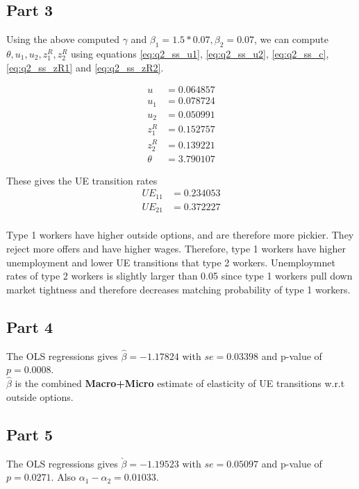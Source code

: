 \subsection*{Part 3}
Using the above computed $\gamma$ and $\beta_1 = 1.5*0.07, \beta_2 = 0.07$, we can compute $\theta, u_1, u_2, z^R_1, z^R_2$ using equations \ref{eq:q2_ss_u1}, \ref{eq:q2_ss_u2}, \ref{eq:q2_ss_c}, \ref{eq:q2_ss_zR1} and \ref{eq:q2_ss_zR2}. 

\begin{align}
    u &= 0.064857\\
    u_1 &= 0.078724\\
    u_2 &= 0.050991 \\
    z^R_1   &= 0.152757\\
    z^R_2   &= 0.139221\\
    \theta &= 3.790107
\end{align}

These gives the UE transition rates
\begin{align}
    UE_{11} &= 0.234053\\
    UE_{21} &= 0.372227\\
\end{align}

Type 1 workers have higher outside options, and are therefore more pickier. They reject more offers and have higher wages. Therefore, type 1 workers have higher unemployment and lower UE transitions that type 2 workers. Unemploymnet rates of type 2 workers is slightly larger than 0.05 since type 1 workers pull down market tightness and therefore decreases matching probability of type 1 workers.


\subsection*{Part 4}

The OLS regressions gives $\hat \beta = -1.17824$ with $se = 0.03398$ and p-value of $p= 0.0008$.\\

$\hat \beta $ is the combined \textbf{Macro+Micro} estimate of elasticity of UE transitions w.r.t outside options.

\subsection*{Part 5}
The OLS regressions gives $\check \beta = -1.19523$ with $se = 0.05097$ and p-value of $p= 0.0271$. Also $\alpha_1 - \alpha_2 = 0.01033$.\\

